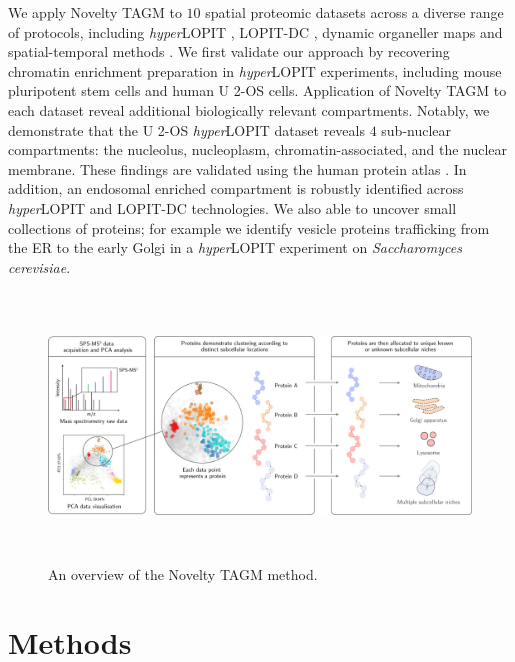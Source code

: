 \documentclass[12pt,english]{article}
\begin{document}
We apply Novelty TAGM to $10$ spatial proteomic datasets across a diverse range of protocols, including \textit{hyper}LOPIT \citep{hyper, Mulvey:2017}, LOPIT-DC \citep{DC:2018}, dynamic organeller maps \citep{Itzhak:2016} and spatial-temporal methods \citep{Jean_Beltran:2016}. We first validate our approach by recovering chromatin enrichment preparation in \textit{hyper}LOPIT experiments, including mouse pluripotent stem cells and human U 2-OS cells. Application of Novelty TAGM to each dataset reveal additional biologically relevant compartments. Notably, we demonstrate that the U 2-OS \textit{hyper}LOPIT dataset reveals $4$ sub-nuclear compartments: the nucleolus,  nucleoplasm, chromatin-associated, and the nuclear membrane. These findings are validated using the human protein atlas \citep{Thul:2017,Sullivan:2018}. In addition, an endosomal enriched compartment is robustly identified across \textit{hyper}LOPIT and LOPIT-DC technologies. We also able to uncover small collections of proteins; for example we identify vesicle proteins trafficking from the ER to the early Golgi in a \textit{hyper}LOPIT experiment on \textit{Saccharomyces cerevisiae}.
\begin{figure}[h]
	
	\centering
	\includegraphics[height=2.8in]{IMG_Protein_Allocation_Draft_v1}
	\caption{An overview of the Novelty TAGM method.}
	\label{figure:overview}
\end{figure}

\section{Methods}
\end{document}
